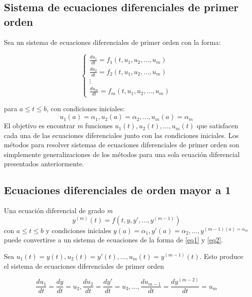 \documentclass[titlepage,a4paper]{article}
\begin{document}
	\subsection{Sistema de ecuaciones diferenciales de primer orden}\cite{burden_system_diff_eq}
		Sea un sistema de ecuaciones diferenciales de primer orden con la forma:

		\begin{equation}
			\label{eq1}
			\begin{cases}
				\frac{du_{1}}{dt}=f_{1}(t,u_{1},u_{2},...,u_{m})\\
				\frac{du_{2}}{dt}=f_{2}(t,u_{1},u_{2},...,u_{m})\\
				\vdots\\
				\frac{du_{m}}{dt}=f_{m}(t,u_{1},u_{2},...,u_{m})
			\end{cases}
		\end{equation}

		para $a \leq t \leq b$, con condiciones iniciales:
		\begin{equation}
			\label{eq2}
			u_{1}(a) = \alpha_{1}, u_{2}(a)=\alpha_{2}, \dots, u_{m}(a)=\alpha_{m}
		\end{equation}
		El objetivo es encontrar \emph{m} funciones $u_{1}(t),u_{2}(t),\dots,u_{m}(t)$ que satisfacen 
		cada una de las ecuaciones diferenciales junto con las condiciones iniciales.
		Los métodos para resolver sistemas de ecuaciones diferenciales de primer orden son simplemente 
		generalizaciones de los métodos para una sola ecuación diferencial presentados anteriormente.

	\subsection{Ecuaciones diferenciales de orden mayor a 1}\cite{burden_higher_order_diff_eq}
			Una ecuación diferencial de grado \emph{m}
			\begin{equation}
				y^{(m)}(t)=f(t,y,y',\dots,y^{(m-1)})
			\end{equation}
			con $a \leq t \leq b$ y condiciones iniciales $y(a)=\alpha_{1},y'(a)=\alpha_{2},\dots,y^{(m-1)(a)=\alpha_{m}}$ 
			puede convertirse a un sistema de ecuaciones de la forma de \eqref{eq1} y \eqref{eq2}.

			Sea $u_{1}(t)=y(t),u_{2}(t)=y'(t),\dots,u_{m}(t)=y^{(m-1)}(t)$. Esto produce el sistema de ecuaciones diferenciales 
			de primer orden

			\begin{equation}
				\frac{du_{1}}{dt}=\frac{dy}{dt}=u_{2},\frac{du_{2}}{dt}=\frac{dy'}{dt}=u_{3},\dots,\frac{du_{m-1}}{dt}=\frac{dy^{(m-2)}}{dt}=u_{m}
			\end{equation}
\end{document}
